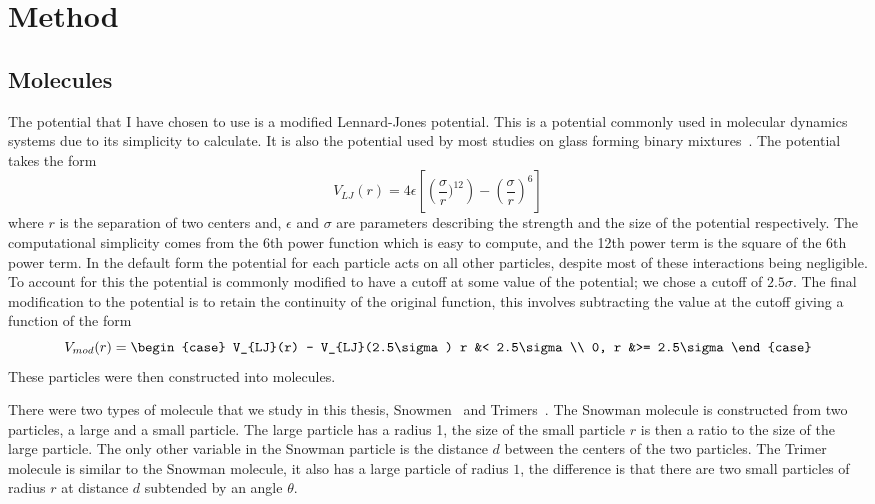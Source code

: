 
\chapter{Method}

\section{Molecules}

The potential that I have chosen to use is a modified Lennard-Jones potential. This is a potential commonly used in molecular dynamics systems due to its simplicity to calculate. It is also the potential used by most studies on glass forming binary mixtures~\tocite. The potential takes the form
\begin{equation}
    V_{LJ}(r) = 4\epsilon\left [ \left (\frac{\sigma}{r})^{12}\right ) -\left ( \frac{\sigma}{r} \right )^6 \right]
\end{equation}
where $r$ is the separation of two centers and, $\epsilon$ and $\sigma$ are parameters describing the strength and the size of the potential respectively. The computational simplicity comes from the 6th power function which is easy to compute, and the 12th power term is the square of the 6th power term. In the default form the potential for each particle acts on all other particles, despite most of these interactions being negligible. To account for this the potential is commonly modified to have a cutoff at some value of the potential; we chose a cutoff of $2.5\sigma$. The final modification to the potential is to retain the continuity of the original function, this involves subtracting the value at the cutoff giving a function of the form
\begin{equation}
    V_{mod}(r) = \begin{case}
        V_{LJ}(r) - V_{LJ}(2.5\sigma) r &< 2.5\sigma \\
        0,  r &>= 2.5\sigma
    \end{case}
\end{equation}
These particles were then constructed into molecules.

There were two types of molecule that we study in this thesis, Snowmen~ and Trimers~. The Snowman molecule is constructed from two particles, a large and a small particle. The large particle has a radius 1, the size of the small particle $r$ is then a ratio to the size of the large particle. The only other variable in the Snowman particle is the distance $d$ between the centers of the two particles. The Trimer molecule is similar to the Snowman molecule, it also has a large particle of radius $1$, the difference is that there are two small particles of radius $r$ at distance $d$ subtended by an angle $\theta$.


